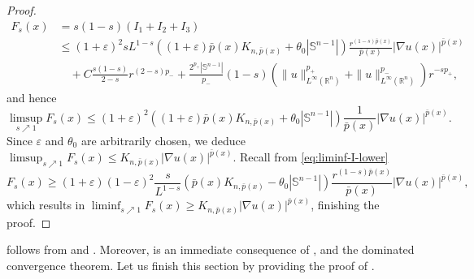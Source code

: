 \documentclass[11pt]{amsart}
\theoremstyle{plain}
\theoremstyle{definition}
\numberwithin{equation}{section}
\begin{document}
\begin{proof}
\begin{equation*}
\begin{split}
F_{s}(x)
&= s(1-s) (I_{1} + I_{2} + I_{3}) \\
&\leq (1+\varepsilon)^{2} sL^{1-s} \left( (1+\varepsilon) \bar{p}(x) K_{n, \bar{p}(x)} + \theta_{0} |\mathbb{S}^{n-1}| \right) \frac{r^{(1-s)\bar{p}(x)}}{\bar{p}(x)} |\nabla u(x)|^{\bar{p}(x)} \\
&\quad + C \frac{s(1-s)}{2-s} r^{(2-s)p_{-}} + \frac{2^{p_{+}} |\mathbb{S}^{n-1}|}{p_{-}} (1-s) \left( \|u\|_{L^{\infty}(\mathbb{R}^{n})}^{p_{+}} + \|u\|_{L^{\infty}(\mathbb{R}^{n})}^{p_{-}} \right) r^{-sp_{+}},
\end{split}
\end{equation*}
and hence
\begin{equation*}
\limsup_{s \nearrow 1} F_{s}(x) \leq (1+\varepsilon)^{2} \left( (1+\varepsilon) \bar{p}(x) K_{n, \bar{p}(x)} + \theta_{0} |\mathbb{S}^{n-1}| \right) \frac{1}{\bar{p}(x)} |\nabla u(x)|^{\bar{p}(x)}.
\end{equation*}
Since $\varepsilon$ and $\theta_{0}$ are arbitrarily chosen, we deduce $\limsup_{s \nearrow 1} F_{s}(x) \leq K_{n, \bar{p}(x)} |\nabla u(x)|^{\bar{p}(x)}$. Recall from \eqref{eq:liminf-I-lower}
\begin{equation*}
F_{s}(x) \geq (1+\varepsilon)(1-\varepsilon)^{2} \frac{s}{L^{1-s}} \left( \bar{p}(x) K_{n, \bar{p}(x)} - \theta_{0} |\mathbb{S}^{n-1}| \right) \frac{r^{(1-s)\bar{p}(x)}}{\bar{p}(x)} |\nabla u(x)|^{\bar{p}(x)},
\end{equation*}
which results in $\liminf_{s \nearrow 1} F_{s}(x) \geq K_{n, \bar{p}(x)} |\nabla u(x)|^{\bar{p}(x)}$, finishing the proof.
\end{proof}

 follows from  and . Moreover,  is an immediate consequence of ,  and the dominated convergence theorem. Let us finish this section by providing the proof of .
\end{document}
